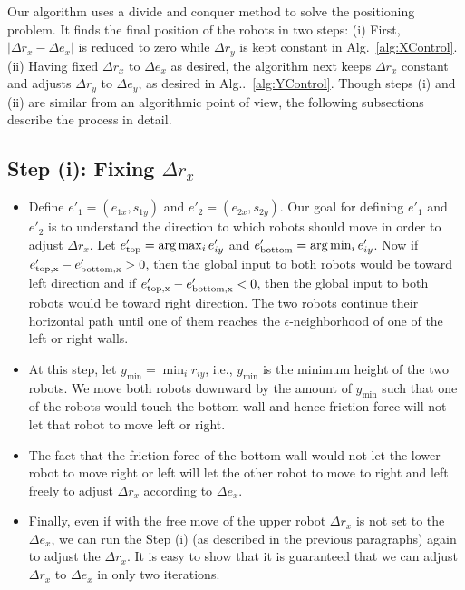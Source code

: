 Our algorithm uses a divide and conquer method to solve the positioning problem. 
It finds the final position of the robots in two steps: (i) First, $|\Delta r_x - \Delta e_x |$ is reduced to zero while  $\Delta r_y$ is kept constant in Alg.~\ref{alg:XControl}. 
(ii) Having fixed $\Delta r_x$ to $\Delta e_x$ as desired, the  algorithm next keeps $\Delta r_x$ constant and adjusts $\Delta r_y$ to $\Delta e_y$, as desired in Alg..~\ref{alg:YControl}. 
Though steps (i) and (ii) are similar from an algorithmic point of view, the following subsections describe the process in detail. 

\subsection{Step (i): Fixing $\Delta r_x$}
\label{theory:step1}
\begin{itemize}
\item Define $e'_1=(e_{1x},s_{1y})$ and $e'_2=(e_{2x},s_{2y})$. Our goal for defining $e'_1$ and $e'_2$ is to understand the direction to which robots should move in order to adjust $\Delta r_x$. Let $e'_{\rm{top}} = \arg \max_i e'_{iy}$ and $e'_{\rm{bottom}} = \arg \min_i e'_{iy}$. Now if $e'_{\rm{top},x}-e'_{\rm{bottom},x}>0$, then the global input to both robots would be toward left direction and if $e'_{\rm{top},x}-e'_{\rm{bottom},x}<0$, then the global input to both robots would be toward right direction. The two robots continue their horizontal path until one of them reaches the $\epsilon$-neighborhood of one of the left or right walls.
\item At this step, let $y_{\min} = \min_i r_{iy}$, i.e., $y_{\min}$ is the minimum height of the two robots. We move both robots downward by the amount of $y_{\min}$ such that one of the robots would touch the bottom wall and hence friction force will not let that robot to move left or right.
\item The fact that the friction force of the bottom wall would not let the lower robot to move right or left will let the other robot to move to right and left freely to adjust $\Delta r_x $ according to $\Delta e_x$.
\item Finally, even if with the free move of the upper robot $\Delta r_x$ is not set to the $\Delta e_x$, we can run the Step (i) (as described in the previous paragraphs) again to adjust the $\Delta r_x$. It is easy to show that it is guaranteed that we can adjust $\Delta r_x$ to $\Delta e_x$ in only two iterations.
\end{itemize}

